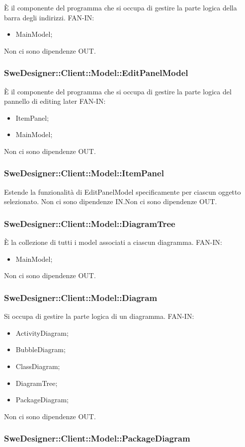 \documentclass[../PianoDiQualifica.tex]{subfiles}
\begin{document}
		È il componente del programma che si occupa di gestire la parte logica della barra degli indirizzi.
		FAN-IN:
		\begin{itemize}
			\item MainModel;
		\end{itemize}
		Non ci sono dipendenze OUT.\subsubsection{SweDesigner::Client::Model::EditPanelModel}
		È il componente del programma che si occupa di gestire la parte logica del pannello di editing later
		FAN-IN:
		\begin{itemize}
			\item ItemPanel;
			\item MainModel;
		\end{itemize}
		Non ci sono dipendenze OUT.\subsubsection{SweDesigner::Client::Model::ItemPanel}
		Estende la funzionalità di EditPanelModel specificamente per ciascun oggetto selezionato.
		Non ci sono dipendenze IN.Non ci sono dipendenze OUT.\subsubsection{SweDesigner::Client::Model::DiagramTree}
		È la collezione di tutti i model associati a ciascun diagramma.
		FAN-IN:
		\begin{itemize}
			\item MainModel;
		\end{itemize}
		Non ci sono dipendenze OUT.\subsubsection{SweDesigner::Client::Model::Diagram}
		Si occupa di gestire la parte logica di un diagramma.
		FAN-IN:
		\begin{itemize}
			\item ActivityDiagram;
			\item BubbleDiagram;
			\item ClassDiagram;
			\item DiagramTree;
			\item PackageDiagram;
		\end{itemize}
		Non ci sono dipendenze OUT.\subsubsection{SweDesigner::Client::Model::PackageDiagram}
\end{document}
